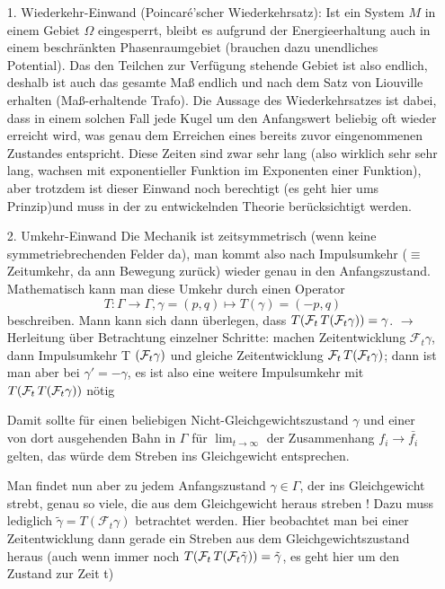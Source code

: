 \documentclass[../KlassMech_main.tex]{subfiles}
\begin{document}
\begin{itemize}
\item[1.] Wiederkehr-Einwand (Poincaré'scher Wiederkehrsatz):
Ist ein System $M$ in einem Gebiet $\Omega$ eingesperrt, bleibt es aufgrund der Energieerhaltung auch in einem beschränkten Phasenraumgebiet (brauchen dazu unendliches Potential). Das den Teilchen zur Verfügung stehende Gebiet ist also endlich, deshalb ist auch das gesamte Maß endlich und nach dem Satz von Liouville erhalten (Maß-erhaltende Trafo). Die Aussage des Wiederkehrsatzes ist dabei, dass in einem solchen Fall jede Kugel um den Anfangswert beliebig oft wieder erreicht wird, was genau dem Erreichen eines bereits zuvor eingenommenen Zustandes entspricht.
Diese Zeiten sind zwar sehr lang (also wirklich sehr sehr lang, wachsen mit exponentieller Funktion im Exponenten einer Funktion), aber trotzdem ist dieser Einwand noch berechtigt (es geht hier ums Prinzip)und muss in der zu entwickelnden Theorie berücksichtigt werden.

\item[2.] Umkehr-Einwand
Die Mechanik ist zeitsymmetrisch (wenn keine symmetriebrechenden Felder da), man kommt also nach Impulsumkehr ($\equiv$ Zeitumkehr, da ann Bewegung zurück) wieder genau in den Anfangszustand.\\
Mathematisch kann man diese Umkehr durch einen Operator
\begin{equation}\label{key}
T: \Gamma \rightarrow \Gamma, \gamma = (p,q) \mapsto T(\gamma) = (-p,q)
\end{equation}
beschreiben. Mann kann sich dann überlegen, dass $T \qty(\mathcal{F}_t \, T \qty(\mathcal{F}_t \gamma)) = \gamma$.
$\rightarrow$ Herleitung über Betrachtung einzelner Schritte: machen Zeitentwicklung $\mathcal{F}_t \gamma$, dann Impulsumkehr T $\qty(\mathcal{F}_t \gamma)$ und gleiche Zeitentwicklung $\mathcal{F}_t \, T \qty(\mathcal{F}_t \gamma)$; dann ist man aber bei $\gamma' = - \gamma$, es ist also eine weitere Impulsumkehr mit $T \qty(\mathcal{F}_t \, T \qty(\mathcal{F}_t \gamma))$ nötig


Damit sollte für einen beliebigen Nicht-Gleichgewichtszustand $\gamma$ und einer von dort ausgehenden Bahn in $\Gamma$ für $\lim_{t\rightarrow \infty}$ der Zusammenhang $f_i \rightarrow \bar{f_i}$ gelten, das würde dem Streben ins Gleichgewicht entsprechen.

Man findet nun aber zu jedem Anfangszustand $\gamma \in \Gamma$, der ins Gleichgewicht strebt, genau so viele, die aus dem Gleichgewicht heraus streben ! Dazu muss lediglich $\tilde{\gamma} = T(\mathcal{F}_t \gamma)$ betrachtet werden. Hier beobachtet man bei einer Zeitentwicklung dann gerade ein Streben aus dem Gleichgewichtszustand heraus (auch wenn immer noch $T \qty(\mathcal{F}_t \, T \qty(\mathcal{F}_t \tilde{\gamma})) = \tilde{\gamma}$, es geht hier um den Zustand zur Zeit t)
\end{itemize}
\end{document}
